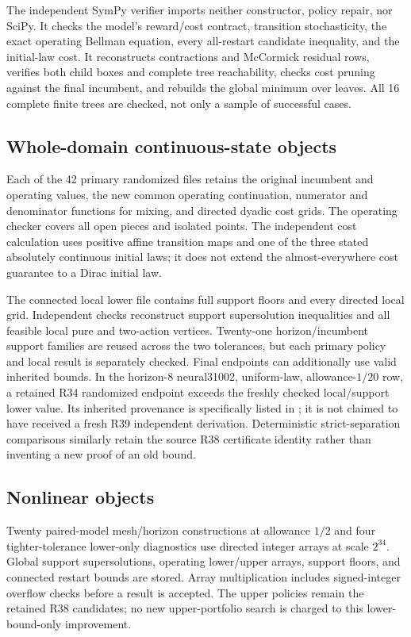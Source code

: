 The independent SymPy verifier imports neither constructor, policy repair, nor SciPy. It checks the model's reward/cost contract, transition stochasticity, the exact operating Bellman equation, every all-restart candidate inequality, and the initial-law cost. It reconstructs contractions and McCormick residual rows, verifies both child boxes and complete tree reachability, checks cost pruning against the final incumbent, and rebuilds the global minimum over leaves. All 16 complete finite trees are checked, not only a sample of successful cases.

\subsection{Whole-domain continuous-state objects}
Each of the 42 primary randomized files retains the original incumbent and operating values, the new common operating continuation, numerator and denominator functions for mixing, and directed dyadic cost grids. The operating checker covers all open pieces and isolated points. The independent cost calculation uses positive affine transition maps and one of the three stated absolutely continuous initial laws; it does not extend the almost-everywhere cost guarantee to a Dirac initial law.

The connected local lower file contains full support floors and every directed local grid. Independent checks reconstruct support supersolution inequalities and all feasible local pure and two-action vertices. Twenty-one horizon/incumbent support families are reused across the two tolerances, but each primary policy and local result is separately checked. Final endpoints can additionally use valid inherited bounds. In the horizon-8 neural31002, uniform-law, allowance-$1/20$ row, a retained R34 randomized endpoint exceeds the freshly checked local/support lower value. Its inherited provenance is specifically listed in ; it is not claimed to have received a fresh R39 independent derivation. Deterministic strict-separation comparisons similarly retain the source R38 certificate identity rather than inventing a new proof of an old bound.

\subsection{Nonlinear objects}
Twenty paired-model mesh/horizon constructions at allowance $1/2$ and four tighter-tolerance lower-only diagnostics use directed integer arrays at scale $2^{34}$. Global support supersolutions, operating lower/upper arrays, support floors, and connected restart bounds are stored. Array multiplication includes signed-integer overflow checks before a result is accepted. The upper policies remain the retained R38 candidates; no new upper-portfolio search is charged to this lower-bound-only improvement.


